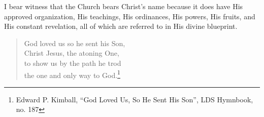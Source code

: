 \documentclass{article}
\begin{document}
I bear witness that the Church bears Christ's name because it does have His approved organization, His teachings, His ordinances, His powers, His fruits, and His constant revelation, all of which are referred to in His divine blueprint.

\begin{quotation}
\noindent
God loved us so he sent his Son,\\
Christ Jesus, the atoning One,\\
to show us by the path he trod\\
the one and only way to God.\footnote{Edward P. Kimball, ``God Loved Us, So He Sent His Son'', LDS Hymnbook, no. 187}
\end{quotation}
\end{document}
